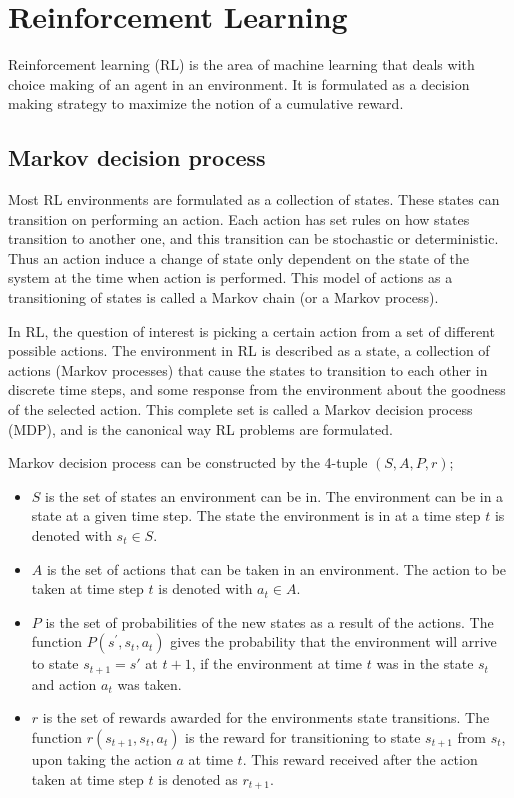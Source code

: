 \documentclass[../dissertation.tex]{subfiles}
\begin{document}
%
\section{Reinforcement Learning}
\label{sec:rl}

Reinforcement learning (RL) is the area of machine learning that deals with choice making of an agent in an environment.
It is formulated as a decision making strategy to maximize the notion of a cumulative reward.

\subsection{Markov decision process}

Most RL environments are formulated as a collection of states.
These states can transition on performing an action.
Each action has set rules on how states transition to another one, and this transition can be stochastic or deterministic.
Thus an action induce a change of state only dependent on the state of the system at the time when action is performed.
This model of actions as a transitioning of states is called a Markov chain (or a Markov process).

In RL, the question of interest is picking a certain action from a set of different possible actions.
The environment in RL is described as a state,
a collection of actions (Markov processes) that cause the states to transition to each other in discrete time steps,
and some response from the environment about the goodness of the selected action.
This complete set is called a Markov decision process (MDP), and is the canonical way RL problems are formulated.

Markov decision process can be constructed by the 4-tuple $(S, A, P, r)$;

\begin{itemize}
    \item $S$ is the set of states an environment can be in.
        The environment can be in a state at a given time step.
        The state the environment is in at a time step $t$ is denoted with $s_t \in S$.
    \item $A$ is the set of actions that can be taken in an environment.
        The action to be taken at time step $t$ is denoted with $a_t \in A$.
    \item $P$ is the set of probabilities of the new states as a result of the actions.
        The function $P(s^{'}, s_{t}, a_{t})$ gives the probability that the environment will arrive to state $s_{t+1} = s'$ at $t+1$, if the environment at time $t$ was in the state $s_t$ and action $a_t$ was taken.
    \item $r$ is the set of rewards awarded for the environments state transitions.
        The function $r(s_{t+1}, s_t, a_t)$ is the reward for transitioning to state $s_{t+1}$ from $s_{t}$, upon taking the action $a$ at time $t$.
        This reward received after the action taken at time step $t$ is denoted as $r_{t+1}$.
\end{itemize}
\end{document}
